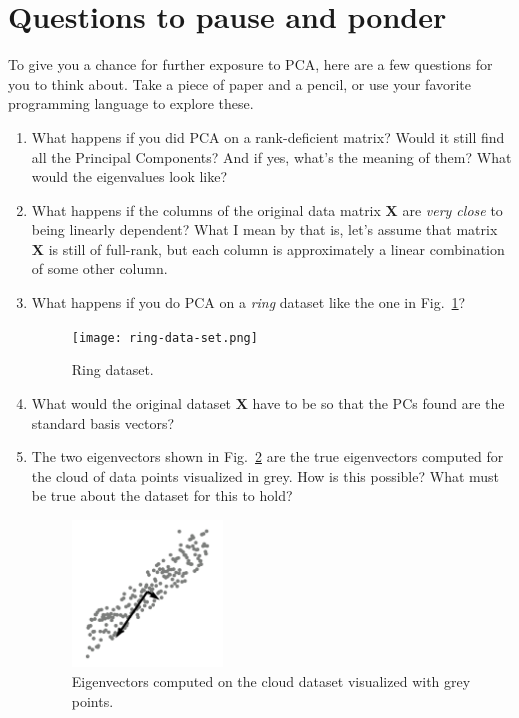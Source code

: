 \documentclass[10pt,twocolumn]{article}
\begin{document}
\section{Questions to pause and ponder} \label{app:questions}

To give you a chance for further exposure to PCA,  here are a few questions for you to think about. Take a piece of paper and a pencil, or use your favorite programming language to explore these.

\begin{enumerate}
\item What happens if you did PCA on a rank-deficient matrix? Would it still find all the Principal Components? And if yes, what's the meaning of them? What would the eigenvalues look like?
\item What happens if the columns of the original data matrix $\mathbf{X}$ are \textit{very close} to being linearly dependent? What I mean by that is, let's assume that matrix $\mathbf{X}$ is still of full-rank, but each column is approximately a linear combination of some other column.
\item What happens if you do PCA on a \textit{ring} dataset like the one in Fig.~\ref{fig:ring-data-set}?
\begin{figure}[H]
\centering\texttt{[image: ring-data-set.png]}
\caption{Ring dataset.}
\label{fig:ring-data-set}
\end{figure}
\item What would the original dataset $\mathbf{X}$ have to be so that the PCs found are the standard basis vectors?
\item The two eigenvectors shown in Fig.~\ref{fig:eigenvectors-question} are the true eigenvectors computed for the cloud of data points visualized in grey. How is this possible? What must be true about the dataset for this to hold?
\begin{figure}[H]
\centering\includegraphics[width=4cm]{eigenvectors-question.pdf}
\caption{Eigenvectors computed on the cloud dataset visualized with grey points.}
\label{fig:eigenvectors-question}
\end{figure}
\end{enumerate}
\end{document}
